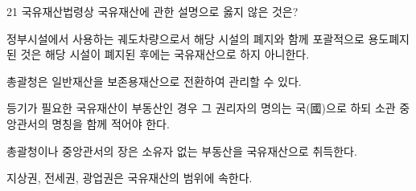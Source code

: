 \begin{question}{21}
국유재산법령상 국유재산에 관한 설명으로 옳지 않은 것은?
\begin{choices}
  \item 정부시설에서 사용하는 궤도차량으로서 해당 시설의 폐지와 함께 포괄적으로 용도폐지된 것은 해당 시설이 폐지된 후에는 국유재산으로 하지 아니한다.
  \item 총괄청은 일반재산을 보존용재산으로 전환하여 관리할 수 있다.
  \item 등기가 필요한 국유재산이 부동산인 경우 그 권리자의 명의는 국(國)으로 하되 소관 중앙관서의 명칭을 함께 적어야 한다.
  \item 총괄청이나 중앙관서의 장은 소유자 없는 부동산을 국유재산으로 취득한다.
  \item 지상권, 전세권, 광업권은 국유재산의 범위에 속한다.
\end{choices}
\end{question}
